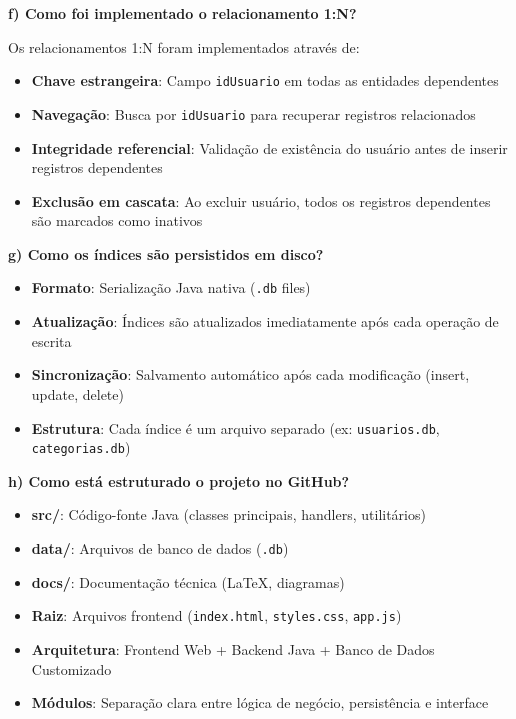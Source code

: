 \documentclass[12pt,a4paper]{article}
\begin{document}
\textbf{f) Como foi implementado o relacionamento 1:N?}

Os relacionamentos 1:N foram implementados através de:
\begin{itemize}
  \item \textbf{Chave estrangeira}: Campo \texttt{idUsuario} em todas as entidades dependentes
  \item \textbf{Navegação}: Busca por \texttt{idUsuario} para recuperar registros relacionados
  \item \textbf{Integridade referencial}: Validação de existência do usuário antes de inserir registros dependentes
  \item \textbf{Exclusão em cascata}: Ao excluir usuário, todos os registros dependentes são marcados como inativos
\end{itemize}

\textbf{g) Como os índices são persistidos em disco?}

\begin{itemize}
  \item \textbf{Formato}: Serialização Java nativa (\texttt{.db} files)
  \item \textbf{Atualização}: Índices são atualizados imediatamente após cada operação de escrita
  \item \textbf{Sincronização}: Salvamento automático após cada modificação (insert, update, delete)
  \item \textbf{Estrutura}: Cada índice é um arquivo separado (ex: \texttt{usuarios.db}, \texttt{categorias.db})
\end{itemize}

\textbf{h) Como está estruturado o projeto no GitHub?}

\begin{itemize}
  \item \textbf{src/}: Código-fonte Java (classes principais, handlers, utilitários)
  \item \textbf{data/}: Arquivos de banco de dados (\texttt{.db})
  \item \textbf{docs/}: Documentação técnica (LaTeX, diagramas)
  \item \textbf{Raiz}: Arquivos frontend (\texttt{index.html}, \texttt{styles.css}, \texttt{app.js})
  \item \textbf{Arquitetura}: Frontend Web + Backend Java + Banco de Dados Customizado
  \item \textbf{Módulos}: Separação clara entre lógica de negócio, persistência e interface
\end{itemize}
\end{document}
